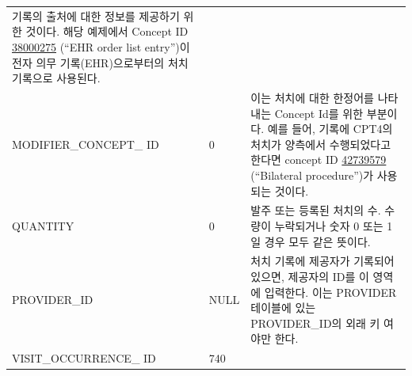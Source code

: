\documentclass[11pt]{book}
\theoremstyle{definition}
\theoremstyle{definition}
\theoremstyle{definition}
\theoremstyle{remark}
\begin{document}
\begin{longtable}[]{@{}lll@{}}
\begin{minipage}[t]{0.48\columnwidth}
기록의 출처에 대한 정보를 제공하기 위한 것이다. 해당 예제에서 Concept ID
\href{http://athena.ohdsi.org/search-terms/terms/38000275}{38000275}
(``EHR order list entry'')이 전자 의무 기록(EHR)으로부터의 처치 기록으로
사용된다.\strut
\end{minipage}\tabularnewline
\begin{minipage}[t]{0.28\columnwidth}\raggedright\strut
MODIFIER\_CONCEPT\_ ID\strut
\end{minipage} & \begin{minipage}[t]{0.16\columnwidth}\raggedright\strut
0\strut
\end{minipage} & \begin{minipage}[t]{0.48\columnwidth}\raggedright\strut
이는 처치에 대한 한정어를 나타내는 Concept Id를 위한 부분이다. 예를
들어, 기록에 CPT4의 처치가 양측에서 수행되었다고 한다면 concept ID
\href{http://athena.ohdsi.org/search-terms/terms/42739579}{42739579}
(``Bilateral procedure'')가 사용되는 것이다.\strut
\end{minipage}\tabularnewline
\begin{minipage}[t]{0.28\columnwidth}\raggedright\strut
QUANTITY\strut
\end{minipage} & \begin{minipage}[t]{0.16\columnwidth}\raggedright\strut
0\strut
\end{minipage} & \begin{minipage}[t]{0.48\columnwidth}\raggedright\strut
발주 또는 등록된 처치의 수. 수량이 누락되거나 숫자 0 또는 1일 경우 모두
같은 뜻이다.\strut
\end{minipage}\tabularnewline
\begin{minipage}[t]{0.28\columnwidth}\raggedright\strut
PROVIDER\_ID\strut
\end{minipage} & \begin{minipage}[t]{0.16\columnwidth}\raggedright\strut
NULL\strut
\end{minipage} & \begin{minipage}[t]{0.48\columnwidth}\raggedright\strut
처치 기록에 제공자가 기록되어 있으면, 제공자의 ID를 이 영역에 입력한다.
이는 PROVIDER 테이블에 있는 PROVIDER\_ID의 외래 키 여야만 한다.\strut
\end{minipage}\tabularnewline
\begin{minipage}[t]{0.28\columnwidth}\raggedright\strut
VISIT\_OCCURRENCE\_ ID\strut
\end{minipage} & \begin{minipage}[t]{0.16\columnwidth}\raggedright\strut
740\strut
\end{minipage} & \begin{minipage}[t]{0.48\columnwidth}\raggedright\strut

\end{minipage}
\end{longtable}
\end{document}
